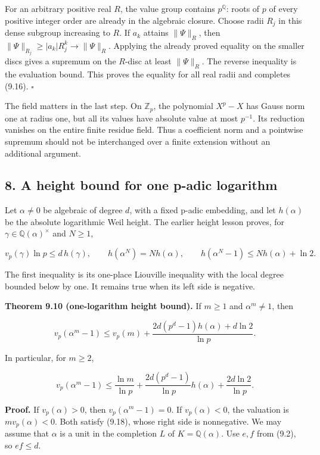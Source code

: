 \documentclass[
  11pt,
  a4paper,
]{article}
\begin{document}
For an arbitrary positive real \(R\), the value group contains
\(p^{\mathbb Q}\): roots of \(p\) of every positive integer order are
already in the algebraic closure. Choose radii \(R_j\) in this dense
subgroup increasing to \(R\). If \(a_k\) attains \(\|\Psi\|_R\), then
\(\|\Psi\|_{R_j}\ge|a_k|R_j^k\to\|\Psi\|_R\). Applying the already
proved equality on the smaller discs gives a supremum on the \(R\)-disc
at least \(\|\Psi\|_R\). The reverse inequality is the evaluation bound.
This proves the equality for all real radii and completes (9.16).
\(\square\)

The field matters in the last step. On \(\mathbb Z_p\), the polynomial
\(X^p-X\) has Gauss norm one at radius one, but all its values have
absolute value at most \(p^{-1}\). Its reduction vanishes on the entire
finite residue field. Thus a coefficient norm and a pointwise supremum
should not be interchanged over a finite extension without an additional
argument.

\subsection{8. A height bound for one p-adic
logarithm}\label{a-height-bound-for-one-p-adic-logarithm}

Let \(\alpha\ne0\) be algebraic of degree \(d\), with a fixed p-adic
embedding, and let \(h(\alpha)\) be the absolute logarithmic Weil
height. The earlier height lesson proves, for
\(\gamma\in\mathbb Q(\alpha)^\times\) and \(N\ge1\),

\[
v_p(\gamma)\ln p\le d\,h(\gamma),
\qquad h(\alpha^N)=Nh(\alpha),
\qquad h(\alpha^N-1)\le Nh(\alpha)+\ln2.
\tag{9.17}
\]

The first inequality is its one-place Liouville inequality with the
local degree bounded below by one. It remains true when its left side is
negative.

\textbf{Theorem 9.10 (one-logarithm height bound).} If \(m\ge1\) and
\(\alpha^m\ne1\), then

\[
v_p(\alpha^m-1)
\le v_p(m)+\frac{2d(p^d-1)h(\alpha)+d\ln2}{\ln p}.
\tag{9.18}
\]

In particular, for \(m\ge2\),

\[
v_p(\alpha^m-1)
\le\frac{\ln m}{\ln p}
+\frac{2d(p^d-1)}{\ln p}h(\alpha)
+\frac{2d\ln2}{\ln p}.
\tag{9.19}
\]

\textbf{Proof.} If \(v_p(\alpha)>0\), then \(v_p(\alpha^m-1)=0\). If
\(v_p(\alpha)<0\), the valuation is \(m v_p(\alpha)<0\). Both satisfy
(9.18), whose right side is nonnegative. We may assume that \(\alpha\)
is a unit in the completion \(L\) of \(K=\mathbb Q(\alpha)\). Use
\(e,f\) from (9.2), so \(ef\le d\).
\end{document}
